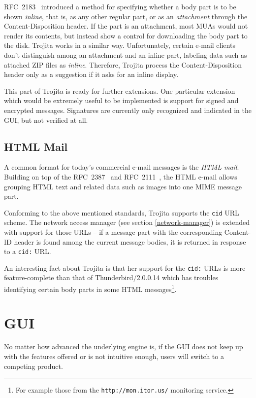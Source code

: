 \documentclass[12pt,notitlepage]{report}
\newcommand{\trojita}{Trojita\xspace}
\begin{document}
RFC~2183~\cite{rfc-content-disposition} introduced a method for specifying
whether a body part is to be shown {\em inline}, that is, as any other regular
part, or as an {\em attachment} through the Content-Disposition header.  If the
part is an attachment, most MUAs would not render its contents, but instead show
a control for downloading the body part to the disk.  \trojita works in a
similar way.  Unfortunately, certain e-mail clients don't distinguish among an
attachment and an inline part, labeling data such as attached ZIP files as {\em
inline}.  Therefore, \trojita process the Content-Disposition header only as a
suggestion if it asks for an inline display.

This part of \trojita is ready for further extensions.  One particular extension
which would be extremely useful to be implemented is support for signed and
encrypted messages.  Signatures are currently only recognized and indicated in
the GUI, but not verified at all.

\subsection{HTML Mail}

A common format for today's commercial e-mail messages is the {\em HTML mail}.
Building on top of the RFC~2387~\cite{rfc-multipart-related} and
RFC~2111~\cite{rfc-content-id}, the HTML e-mail allows grouping HTML text and
related data such as images into one MIME message part.

Conforming to the above mentioned standards, \trojita supports the {\tt cid} URL
scheme.  The network access manager (see section \ref{network-manager}) is
extended with support for those URLs -- if a message part with the corresponding
Content-ID header is found among the current message bodies, it is returned in
response to a {\tt cid:} URL.

An interesting fact about \trojita is that her support for the {\tt cid:} URLs
is more feature-complete than that of Thunderbird/2.0.0.14 which has troubles
identifying certain body parts in some HTML messages\footnote{For example those
from the {\tt http://mon.itor.us/} monitoring service.}.

\section{GUI}

No matter how advanced the underlying engine is, if the GUI does not keep up
with the features offered or is not intuitive enough, users will switch to a
competing product.
\end{document}
